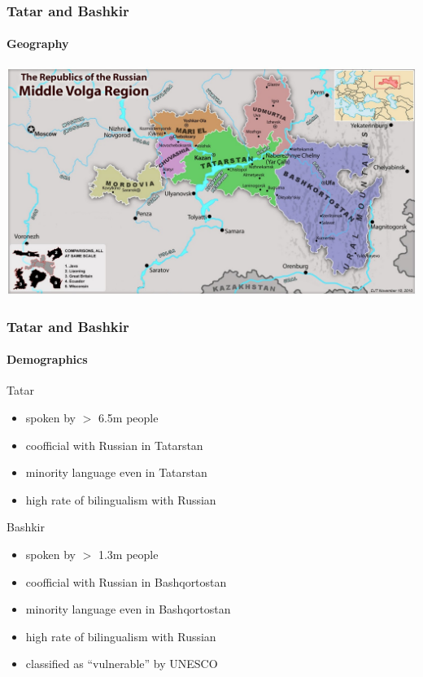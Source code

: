 \documentclass[10pt,xetex]{beamer} %
\begin{document}
\begin{frame}
  \frametitle{Tatar and Bashkir} %
  \framesubtitle{Geography}
		\vspace{0.2em}
		\noindent\hspace{-2.75em}\includegraphics[width=1.175\textwidth]{middlevolga19001500.jpg}
\end{frame}
\begin{frame}
	\frametitle{Tatar and Bashkir}
	\framesubtitle{Demographics}
    
    \begin{block}{Tatar}
      
      \begin{itemize}
        \item spoken by $>$ 6.5m people \citep{lewis2009}
		  \item coofficial with Russian in Tatarstan
		  \item minority language even in Tatarstan
		  \item high rate of bilingualism with Russian
      \end{itemize}
      
    \end{block}
      
    \begin{block}{Bashkir}
      
      \begin{itemize}
        \item spoken by $>$ 1.3m people \citep{lewis2009}
		  \item coofficial with Russian in Bashqortostan
		  \item minority language even in Bashqortostan
		  \item high rate of bilingualism with Russian
		  \item classified as ``vulnerable'' by UNESCO
      \end{itemize}
    
    \end{block}
\end{frame}
\end{document}
